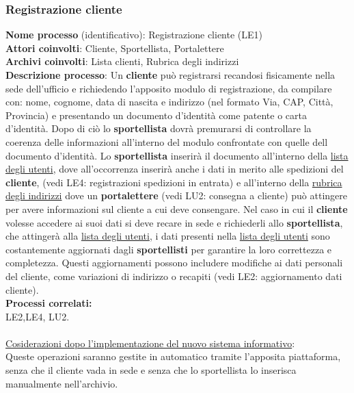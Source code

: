 \subsubsection{Registrazione cliente}
\textbf{Nome processo} (identificativo): Registrazione cliente (LE1) \\
\textbf{Attori coinvolti}: Cliente, Sportellista, Portalettere \\
\textbf{Archivi coinvolti}: Lista clienti, Rubrica degli indirizzi\\ 
\textbf{Descrizione processo}: Un \textbf{cliente} può registrarsi recandosi fisicamente nella sede dell'ufficio e richiedendo l'apposito modulo di registrazione, 
da compilare con: nome, cognome, data di nascita e indirizzo (nel formato Via, CAP, Città, Provincia) e presentando un documento d'identità come patente o carta d'identità. 
Dopo di ciò lo \textbf{sportellista} dovrà premurarsi di controllare la coerenza delle informazioni all'interno del modulo confrontate con quelle dell documento d'identità. 
Lo \textbf{sportellista} inserirà il documento all'interno della \underline{lista degli utenti}, dove all'occorrenza inserirà anche i dati in merito alle spedizioni del \textbf{cliente}, (vedi LE4: registrazioni spedizioni in entrata) e all'interno della \underline{rubrica degli indirizzi} dove un \textbf{portalettere} 
(vedi LU2: consegna a cliente) può attingere per avere informazioni sul cliente a cui deve consengare.  Nel caso in cui il \textbf{cliente} volesse accedere ai 
suoi dati si deve recare in sede e richiederli allo \textbf{sportellista}, che attingerà alla \underline{lista degli utenti}, i dati presenti nella 
\underline{lista degli utenti} sono costantemente aggiornati dagli \textbf{sportellisti} per garantire la loro correttezza e completezza. 
Questi aggiornamenti possono includere modifiche ai dati personali del cliente, come variazioni di indirizzo o recapiti (vedi LE2: aggiornamento dati cliente). \\
\textbf{Processi correlati:}\\LE2,LE4, LU2.\\ \\
\underline{Cosiderazioni dopo l'implementazione del nuovo sistema informativo}: \\ Queste operazioni saranno gestite in automatico tramite l'apposita piattaforma, 
senza che il cliente vada in sede e senza che lo sportellista lo inserisca manualmente nell'archivio.
